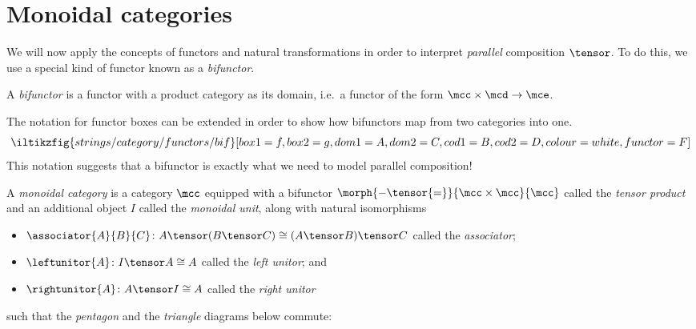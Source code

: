 \section{Monoidal categories}

We will now apply the concepts of functors and natural transformations in order
to interpret \emph{parallel} composition \(\tensor\).
To do this, we use a special kind of functor known as a \emph{bifunctor}.

\begin{definition}[Bifunctor]
    A \emph{bifunctor} is a functor with a product category as its domain, i.e.\
    a functor of the form \(\mcc \times \mcd \to \mce\).
\end{definition}

The notation for functor boxes can be extended in order to show how bifunctors
map from two categories into one.
\[
    \iltikzfig{strings/category/functors/bif}[box1=f,box2=g,dom1=A,dom2=C,cod1=B,cod2=D,colour=white,functor=F]
\]
This notation suggests that a bifunctor is exactly what we need to model
parallel composition!

\begin{definition}
    \label{def:monoidal-category}
    A \emph{monoidal category} is a category \(\mcc\) equipped with a
    bifunctor \(\morph{{-} \tensor {=}}{\mcc \times \mcc}{\mcc}\) called the
    \emph{tensor product} and an additional object \(I\) called the
    \emph{monoidal unit},
    along with natural isomorphisms
    \begin{itemize}
        \item \(
              \associator{A}{B}{C}
              \colon
              A \tensor (B \tensor C)
              \cong
              (A \tensor B) \tensor C
              \) called the \emph{associator};
        \item \(
              \leftunitor{A}
              \colon
              I \tensor A
              \cong
              A
              \) called the \emph{left unitor}; and
        \item \(
              \rightunitor{A}
              \colon
              A \tensor I
              \cong
              A
              \) called the \emph{right unitor}
    \end{itemize}
    such that the \emph{pentagon} and the \emph{triangle} diagrams below
    commute:
    \begin{center}
        

        \vspace{1em}

        
    \end{center}
\end{definition}


